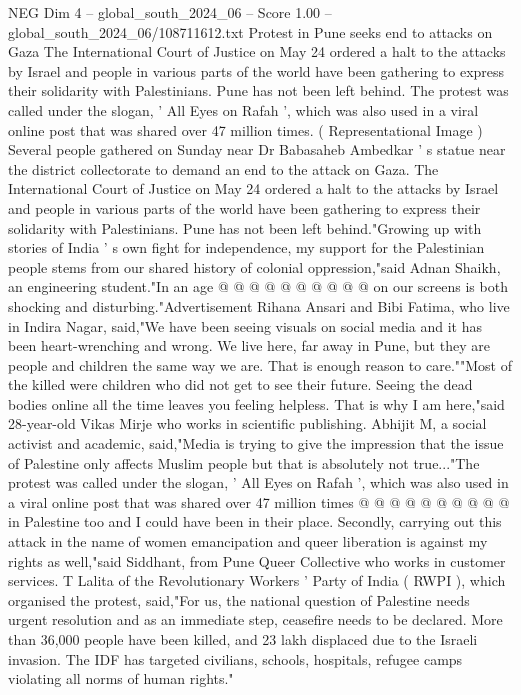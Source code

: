 \begin{textsample}{NEG Dim 4 – global\_south\_2024\_06 – Score 1.00 – global\_south\_2024\_06/108711612.txt}  \label{ex:f4_neg_374}
Protest in Pune seeks end to attacks on Gaza The International Court of Justice on May 24 ordered a halt to the attacks by Israel and people in various parts of the world have been gathering to express their solidarity with Palestinians.
Pune has not been left behind.
The protest was called under the slogan, ' All Eyes on Rafah ', which was also used in a viral online post that was shared over 47 million times. ( Representational Image ) Several people gathered on Sunday near Dr Babasaheb Ambedkar ' s statue near the district collectorate to demand an end to the attack on Gaza.
The International Court of Justice on May 24 ordered a halt to the attacks by Israel and people in various parts of the world have been gathering to express their solidarity with Palestinians.
Pune has not been left behind."Growing up with stories of India ' s own fight for independence, my support for the Palestinian people stems from our shared history of colonial oppression,"said Adnan Shaikh, an engineering student."In an age @ @ @ @ @ @ @ @ @ @ on our screens is both shocking and disturbing."Advertisement Rihana Ansari and Bibi Fatima, who live in Indira Nagar, said,"We have been seeing visuals on social media and it has been heart-wrenching and wrong.
We live here, far away in Pune, but they are people and children the same way we are.
That is enough reason to care.""Most of the killed were children who did not get to see their future.
Seeing the dead bodies online all the time leaves you feeling helpless.
That is why I am here,"said 28-year-old Vikas Mirje who works in scientific publishing.
Abhijit M, a social activist and academic, said,"Media is trying to give the impression that the issue of Palestine only affects Muslim people but that is absolutely not true..."The protest was called under the slogan, ' All Eyes on Rafah ', which was also used in a viral online post that was shared over 47 million times @ @ @ @ @ @ @ @ @ @ in Palestine too and I could have been in their place.
Secondly, carrying out this attack in the name of women emancipation and queer liberation is against my rights as well,"said Siddhant, from Pune Queer Collective who works in customer services.
T Lalita of the Revolutionary Workers ' Party of India ( RWPI ), which organised the protest, said,"For us, the national question of Palestine needs urgent resolution and as an immediate step, ceasefire needs to be declared.
More than 36,000 people have been killed, and 23 lakh displaced due to the Israeli invasion.
The IDF has targeted civilians, schools, hospitals, refugee camps violating all norms of human rights."

\end{textsample}
